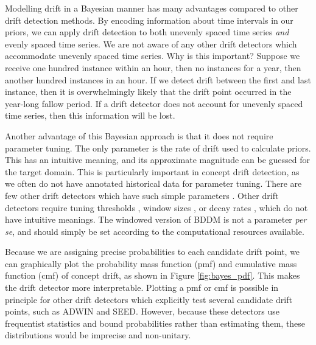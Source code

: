 Modelling drift in a Bayesian manner has many advantages compared to other drift detection methods. By encoding information about time intervals in our priors, we can apply drift detection to both unevenly spaced time series {\it and} evenly spaced time series. We are not aware of any other drift detectors which accommodate unevenly spaced time series. Why is this important? Suppose we receive one hundred instance within an hour, then no instances for a year, then another hundred instances in an hour. If we detect drift between the first and last instance, then it is overwhelmingly likely that the drift point occurred in the year-long fallow period. If a drift detector does not account for unevenly spaced time series, then this information will be lost.

Another advantage of this Bayesian approach is that it does not require parameter tuning. The only parameter is the rate of drift used to calculate priors. This has an intuitive meaning, and its approximate magnitude can be guessed for the target domain. This is particularly important in concept drift detection, as we often do not have annotated historical data for parameter tuning. There are few other drift detectors which have such simple parameters \cite{DDM}\cite{CUSUM}. Other drift detectors require tuning thresholds \cite{ADWIN}\cite{HDDM}, window sizes \cite{STEPD}\cite{PL}, or decay rates \cite{HDDM}\cite{EWMA}, which do not have intuitive meanings. The windowed version of BDDM is not a parameter {\it per se}, and should simply be set according to the computational resources available.

Because we are assigning precise probabilities to each candidate drift point, we can graphically plot the probability mass function (pmf) and cumulative mass function (cmf) of concept drift, as shown in Figure \ref{fig:bayes_pdf}. This makes the drift detector more interpretable. Plotting a pmf or cmf is possible in principle for other drift detectors which explicitly test several candidate drift points, such as ADWIN and SEED. However, because these detectors use frequentist statistics and bound probabilities rather than estimating them, these distributions would be imprecise and non-unitary.



